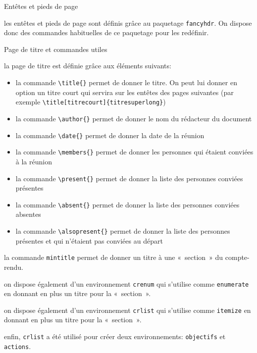\documentclass[fr,cr]{supaero-mins}
\begin{document}
\begin{crlist}{Entêtes et pieds de page}
\item les entêtes et pieds de page sont définis grâce au paquetage
  \texttt{fancyhdr}. On dispose donc des commandes habituelles de ce
  paquetage pour les redéfinir.
\end{crlist}

\begin{crlist}{Page de titre et commandes utiles}
\item la page de titre est définie grâce aux éléments suivants:

  \begin{itemize}
  \item la commande \verb!\title{}! permet de donner le titre. On peut
    lui donner en option un titre court qui servira sur les entêtes
    des pages suivantes (par exemple
    \verb!\title[titrecourt]{titresuperlong}!)
  \item la commande \verb!\author{}! permet de donner le nom du
    rédacteur du document
  \item la commande \verb!\date{}! permet de donner la date de la
    réunion
  \item la commande \verb!\members{}! permet de donner les personnes
    qui étaient conviées à la réunion
  \item la commande \verb!\present{}! permet de donner la liste des
    personnes conviées présentes
  \item la commande \verb!\absent{}! permet de donner la liste des
    personnes conviées absentes
  \item la commande \verb!\alsopresent{}! permet de donner la liste
    des personnes présentes et qui n'étaient pas conviées au départ
  \end{itemize}

\item la commande \verb!mintitle! permet de donner un titre à une
  «~section~» du compte-rendu.
\item on dispose également d'un environnement \verb!crenum! qui
  s'utilise comme \verb!enumerate! en donnant en plus un titre pour la
  «~section~».
\item on dispose également d'un environnement \verb!crlist! qui
  s'utilise comme \verb!itemize! en donnant en plus un titre pour la
  «~section~».
\item enfin, \verb!crlist! a été utilisé pour créer deux
  environnements: \verb!objectifs! et \verb!actions!.
\end{crlist}
\end{document}
